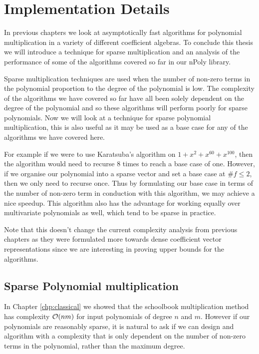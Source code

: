 \chapter{Implementation Details}\label{chp:implementation}

In previous chapters we look at asymptotically fast algorithms for polynomial multiplication in a variety of different coefficient algebras. To conclude this thesis we will introduce a technique for sparse multiplication and an analysis of the performance of some of the algorithms covered so far in our nPoly library\cite{npoly}. 

Sparse multiplication techniques are used when the number of non-zero terms in the polynomial proportion to the degree of the polynomial is low. The complexity of the algorithms we have covered so far have all been solely dependent on the degree of the polynomial and so these algorithms will perform poorly for sparse polynomials. Now we will look at a technique for sparse polynomial multiplication, this is also useful as it may be used as a base case for any of the algorithms we have covered here.

For example if we were to use Karatsuba's algorithm on $1 + x^2 + x^{60} + x^{100}$, then the algorithm would need to recurse $8$ times to reach a base case of one. However, if we organise our polynomial into a sparse vector and set a base case at $\# f \le 2$, then we only need to recurse once. Thus by formulating our base case in terms of the number of non-zero term in conduction with this algorithm, we may achieve a nice speedup. This algorithm also has the advantage for working equally over multivariate polynomials as well, which tend to be sparse in practice.

Note that this doesn't change the current complexity analysis from previous chapters as they were formulated more towards dense coefficient vector representations since we are interesting in proving upper bounds for the algorithms. 

\section{Sparse Polynomial multiplication}

In Chapter \ref{chp:classical} we showed that the schoolbook multiplication method has complexity $\mathcal O(nm)$ for input polynomials of degree $n$ and $m$. However if our polynomials are reasonably sparse, it is natural to ask if we can design and algorithm with a complexity that is only dependent on the number of non-zero terms in the polynomial, rather than the maximum degree.

